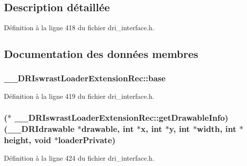 \subsection{Description détaillée}


Définition à la ligne 418 du fichier dri\-\_\-interface.\-h.



\subsection{Documentation des données membres}
\hypertarget{struct_____d_r_iswrast_loader_extension_rec_a96cf72333713114d44048417ae72c9a5}{
\subsubsection[{base}]{ \-\_\-\-\_\-\-D\-R\-Iswrast\-Loader\-Extension\-Rec\-::base}}\label{struct_____d_r_iswrast_loader_extension_rec_a96cf72333713114d44048417ae72c9a5}


Définition à la ligne 419 du fichier dri\-\_\-interface.\-h.

\hypertarget{struct_____d_r_iswrast_loader_extension_rec_aab569a9dfd8d660e8bac16c94c123b86}{
\subsubsection[{get\-Drawable\-Info}]{($\ast$ \-\_\-\-\_\-\-D\-R\-Iswrast\-Loader\-Extension\-Rec\-::get\-Drawable\-Info)({\bf \-\_\-\-\_\-\-D\-R\-Idrawable} $\ast$drawable, int $\ast${\bf x}, int $\ast${\bf y}, int $\ast${\bf width}, int $\ast${\bf height}, {\bf void} $\ast$loader\-Private)}}\label{struct_____d_r_iswrast_loader_extension_rec_aab569a9dfd8d660e8bac16c94c123b86}


Définition à la ligne 424 du fichier dri\-\_\-interface.\-h.

